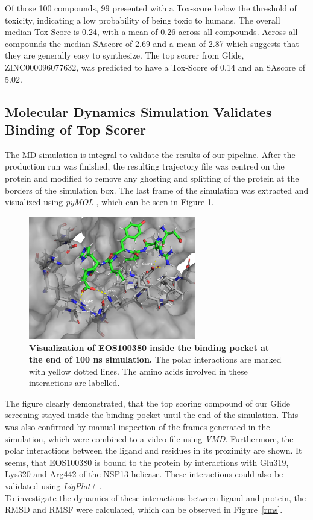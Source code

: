 \documentclass[11pt, letterpaper, titlepage]{article}
\renewcommand{\cite}{\parencite}
\begin{document}
\noindent Of those 100 compounds, 99 presented with a Tox-score below the threshold of toxicity, indicating a low probability of being toxic to humans. The overall median Tox-Score is 0.24, with a mean of 0.26 across all compounds. Across all compounds the median SAscore of 2.69 and a mean of 2.87 which suggests that they are generally easy to synthesize. The top scorer from Glide, ZINC000096077632, was predicted to have a Tox-Score of 0.14 and an SAscore of 5.02.


\subsection{Molecular Dynamics Simulation Validates Binding of Top Scorer}
The \ac{MD} simulation is integral to validate the results of our pipeline. After the production run was finished, the resulting trajectory file was centred on the protein and modified to remove any ghosting and splitting of the protein at the borders of the simulation box. The last frame of the simulation was extracted and visualized using \textit{pyMOL} \cite{PyMOL}, which can be seen in Figure \ref{MD.Annotated}.
\begin{figure}[h]
  \begin{center}
    \includegraphics[width=0.65\textwidth]{last_frame_render_annotated.pdf}
  \end{center}
  \caption{\textbf{Visualization of EOS100380 inside the binding pocket at the end of 100 ns simulation.} The polar interactions are marked with yellow dotted lines. The amino acids involved in these interactions are labelled.}\label{MD.Annotated}
\end{figure}
The figure clearly demonstrated, that the top scoring compound of our Glide screening stayed inside the binding pocket until the end of the simulation. This was also confirmed by manual inspection of the frames generated in the simulation, which were combined to a video file using \textit{VMD}. Furthermore, the polar interactions between the ligand and residues in its proximity are shown. It seems, that EOS100380 is bound to the protein by interactions with Glu319, Lys320 and Arg442 of the NSP13 helicase. These interactions could also be validated using \textit{LigPlot+} \cite{LigPlot}.\\
To investigate the dynamics of these interactions between ligand and protein, the \ac{RMSD} and \ac{RMSF} were calculated, which can be observed in Figure~\ref{rms}. \\
\end{document}
